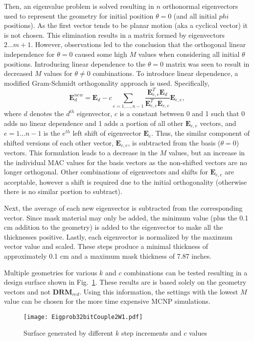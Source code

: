 \documentclass[3p,times]{elsarticle}
\begin{document}
Then, an eigenvalue problem is solved resulting in $n$ orthonormal eigenvectors used to represent the geometry for initial position $\theta=0$ (and all initial $phi$ positions).  
As the first vector tends to be planar motion (aka a cyclical vector) it is not chosen.  This elimination results in a matrix formed 
by eigenvectors $2...m+1$.  However, observations led to the conclusion that the orthogonal linear independence for $\theta=0$ caused some high $M$ values when 
considering all initial $\theta$ positions.  Introducing 
linear dependence to the $\theta=0$ matrix was seen to result in decreased $M$ values for $\theta\neq 0$ combinations.  To introduce linear dependence, a modified Gram-Schmidt orthogonality approach is used.  Specifically, 
\begin{equation}
\mathbf{E}^{new}_{d}=\mathbf{E}_{d}- c \sum_{e=1,...,n-1} \frac{\mathbf{E}_{e,e}^T \mathbf{E}_{d}}{\mathbf{E}_{e,e}^T \mathbf{E}_{e,e}}\mathbf{E}_{e,e},
\label{eq:GS}
\end{equation}
where $d$ denotes the $d^{th}$ eigenvector, $c$ is a constant between 0 and 1 such that 0 adds no linear dependence and 1 adds a portion of all other $\mathbf{E}_{e,e}$ vectors, 
and $e=1...n-1$ is the $e^{th}$ left shift of eigenvector $\mathbf{E}_e$. Thus, the similar component of shifted versions of each other vector, $\mathbf{E}_{e,e}$, is subtracted from
the basis ($\theta=0$) vectors. This formulation leads
to a decrease in the $M$ values, but an increase in the individual MAC values for the basis vectors as the non-shifted vectors are no longer orthogonal.
Other combinations of eigenvectors and shifts for $\mathbf{E}_{e,e}$ are acceptable, however a shift is required due to the initial orthogonality (otherwise there is no similar portion to subtract).

Next, the average of each new eigenvector is subtracted from the corresponding vector.  Since mask material may only be added, the minimum value (plus the 0.1 cm addition to the geometry) 
is added to the eigenvector to make all the thicknesses positive.  Lastly, each eigenvector is normalized by the maximum vector value and scaled.  
These steps produce a minimal thickness of approximately 0.1 cm and a maximum mask thickness of 7.87 inches.

Multiple geometries for various $k$ and $c$ combinations can be tested resulting in a design surface shown in Fig.~\ref{fig:surf}.  These results are is based solely on the geometry vectors
and not $\mathbf{DRM}_{red}$.  
Using this information, the settings with the lowest $M$ value can be chosen for the more time expensive MCNP simulations.
\begin{figure}[ht!]
\texttt{[image: Eigprob32bitCouple2W1.pdf]}
\centering
\caption{Surface generated by different $k$ step increments and $c$ values}
\label{fig:surf}
\end{figure}
\end{document}
